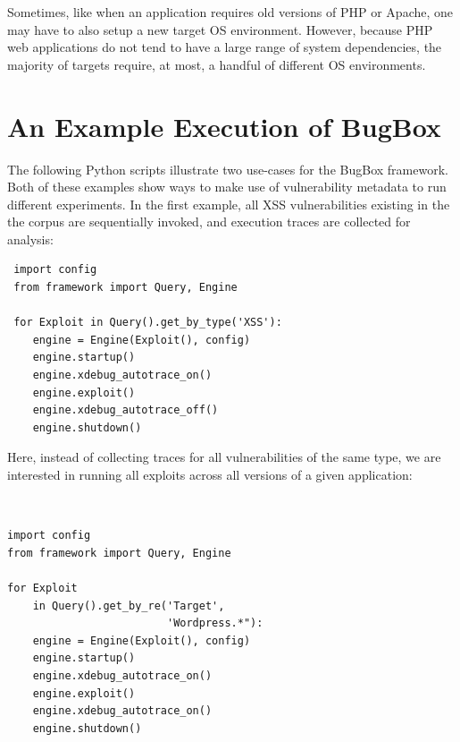 \documentclass[letterpaper,twocolumn,10pt]{article}
\begin{document}
Sometimes, like when an application requires old versions of PHP or Apache, one may have to also setup a new target OS environment. However, because PHP web applications do not tend to have a large range of system dependencies, the majority of targets require, at most, a handful of different OS environments. \par

\section {An Example Execution of BugBox}

The following Python scripts illustrate two use-cases for the BugBox framework. Both of these examples show ways to make use of vulnerability metadata to run different experiments. In the first example, all XSS vulnerabilities existing in the the corpus are sequentially invoked, and execution traces are collected for analysis:

\begin{minipage}{\textwidth}
{\tt \footnotesize

\begin{lstlisting}
 import config
 from framework import Query, Engine
 
 for Exploit in Query().get_by_type('XSS'):
    engine = Engine(Exploit(), config)
    engine.startup()
    engine.xdebug_autotrace_on()
    engine.exploit()
    engine.xdebug_autotrace_off()
    engine.shutdown()
\end{lstlisting}
}
\end{minipage}


Here, instead of collecting traces for all vulnerabilities of the same type, we are interested in running all exploits across all versions of a given application:

\begin{minipage}{\textwidth}
{\tt \footnotesize
\begin{lstlisting}
import config
from framework import Query, Engine

for Exploit 
    in Query().get_by_re('Target', 
                         'Wordpress.*"):
    engine = Engine(Exploit(), config)
    engine.startup()
    engine.xdebug_autotrace_on()
    engine.exploit()
    engine.xdebug_autotrace_on()
    engine.shutdown()
\end{lstlisting}
}
\end{minipage}
\end{document}
